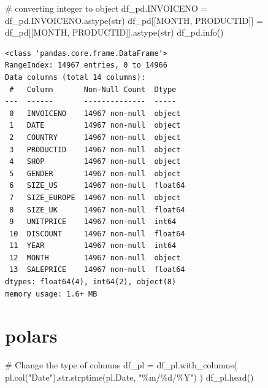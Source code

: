 \documentclass[
  letterpaper,
  DIV=11,
  numbers=noendperiod]{scrreprt}
\newenvironment{Shaded}{\begin{snugshade}}{\end{snugshade}}
\newcommand{\BuiltInTok}[1]{\textcolor[rgb]{0.00,0.23,0.31}{#1}}
\newcommand{\CommentTok}[1]{\textcolor[rgb]{0.37,0.37,0.37}{#1}}
\newcommand{\NormalTok}[1]{\textcolor[rgb]{0.00,0.23,0.31}{#1}}
\newcommand{\OperatorTok}[1]{\textcolor[rgb]{0.37,0.37,0.37}{#1}}
\newcommand{\SpecialCharTok}[1]{\textcolor[rgb]{0.37,0.37,0.37}{#1}}
\newcommand{\StringTok}[1]{\textcolor[rgb]{0.13,0.47,0.30}{#1}}
\begin{document}
\begin{Shaded}
\begin{Highlighting}[]
\CommentTok{\# converting integer to object}
\NormalTok{df\_pd.INVOICENO }\OperatorTok{=}\NormalTok{ df\_pd.INVOICENO.astype(}\BuiltInTok{str}\NormalTok{)}
\NormalTok{df\_pd[[}\StringTok{\textquotesingle{}MONTH\textquotesingle{}}\NormalTok{, }\StringTok{\textquotesingle{}PRODUCTID\textquotesingle{}}\NormalTok{]] }\OperatorTok{=}\NormalTok{ df\_pd[[}\StringTok{\textquotesingle{}MONTH\textquotesingle{}}\NormalTok{, }\StringTok{\textquotesingle{}PRODUCTID\textquotesingle{}}\NormalTok{]].astype(}\BuiltInTok{str}\NormalTok{)}
\NormalTok{df\_pd.info()}
\end{Highlighting}
\end{Shaded}

\begin{verbatim}
<class 'pandas.core.frame.DataFrame'>
RangeIndex: 14967 entries, 0 to 14966
Data columns (total 14 columns):
 #   Column       Non-Null Count  Dtype  
---  ------       --------------  -----  
 0   INVOICENO    14967 non-null  object 
 1   DATE         14967 non-null  object 
 2   COUNTRY      14967 non-null  object 
 3   PRODUCTID    14967 non-null  object 
 4   SHOP         14967 non-null  object 
 5   GENDER       14967 non-null  object 
 6   SIZE_US      14967 non-null  float64
 7   SIZE_EUROPE  14967 non-null  object 
 8   SIZE_UK      14967 non-null  float64
 9   UNITPRICE    14967 non-null  int64  
 10  DISCOUNT     14967 non-null  float64
 11  YEAR         14967 non-null  int64  
 12  MONTH        14967 non-null  object 
 13  SALEPRICE    14967 non-null  float64
dtypes: float64(4), int64(2), object(8)
memory usage: 1.6+ MB
\end{verbatim}

\section{polars}

\begin{Shaded}
\begin{Highlighting}[]
\CommentTok{\# Change the type of columns }
\NormalTok{df\_pl }\OperatorTok{=}\NormalTok{ df\_pl.with\_columns(}
\NormalTok{    pl.col(}\StringTok{"Date"}\NormalTok{).}\BuiltInTok{str}\NormalTok{.strptime(pl.Date, }\StringTok{"\%m/}\SpecialCharTok{\%d}\StringTok{/\%Y"}\NormalTok{)}
\NormalTok{)}
\NormalTok{df\_pl.head()}
\end{Highlighting}
\end{Shaded}
\end{document}
